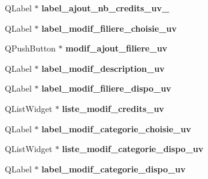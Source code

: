 \begin{DoxyCompactItemize}
\item 
\hypertarget{class_ui___administration_ab1a86156b83db8bab09d4efd2ad128c9}{Q\+Label $\ast$ {\bfseries label\+\_\+ajout\+\_\+nb\+\_\+credits\+\_\+uv\+\_}}\label{class_ui___administration_ab1a86156b83db8bab09d4efd2ad128c9}

\item 
\hypertarget{class_ui___administration_a2e1322198322fcad5e8406905ebda19c}{Q\+Label $\ast$ {\bfseries label\+\_\+modif\+\_\+filiere\+\_\+choisie\+\_\+uv}}\label{class_ui___administration_a2e1322198322fcad5e8406905ebda19c}

\item 
\hypertarget{class_ui___administration_a4f93f3f236b2c9650899b73e3c27d605}{Q\+Push\+Button $\ast$ {\bfseries modif\+\_\+ajout\+\_\+filiere\+\_\+uv}}\label{class_ui___administration_a4f93f3f236b2c9650899b73e3c27d605}

\item 
\hypertarget{class_ui___administration_aea375e91f7a0ca5078becedb81ad5ca4}{Q\+Label $\ast$ {\bfseries label\+\_\+modif\+\_\+description\+\_\+uv}}\label{class_ui___administration_aea375e91f7a0ca5078becedb81ad5ca4}

\item 
\hypertarget{class_ui___administration_aa47c6f3a8446674d56f3f198715f7004}{Q\+Label $\ast$ {\bfseries label\+\_\+modif\+\_\+filiere\+\_\+dispo\+\_\+uv}}\label{class_ui___administration_aa47c6f3a8446674d56f3f198715f7004}

\item 
\hypertarget{class_ui___administration_a85e39c3deb26db195b43b1fa517bba16}{Q\+List\+Widget $\ast$ {\bfseries liste\+\_\+modif\+\_\+credits\+\_\+uv}}\label{class_ui___administration_a85e39c3deb26db195b43b1fa517bba16}

\item 
\hypertarget{class_ui___administration_aed96770a147cadce9bc1f4bf638c8b39}{Q\+Label $\ast$ {\bfseries label\+\_\+modif\+\_\+categorie\+\_\+choisie\+\_\+uv}}\label{class_ui___administration_aed96770a147cadce9bc1f4bf638c8b39}

\item 
\hypertarget{class_ui___administration_ad777b558d250de875a1121edcac338e0}{Q\+List\+Widget $\ast$ {\bfseries liste\+\_\+modif\+\_\+categorie\+\_\+dispo\+\_\+uv}}\label{class_ui___administration_ad777b558d250de875a1121edcac338e0}

\item 
\hypertarget{class_ui___administration_a14975ade20fe6bc25603220c123963eb}{Q\+Label $\ast$ {\bfseries label\+\_\+modif\+\_\+categorie\+\_\+dispo\+\_\+uv}}\label{class_ui___administration_a14975ade20fe6bc25603220c123963eb}


\end{DoxyCompactItemize}
